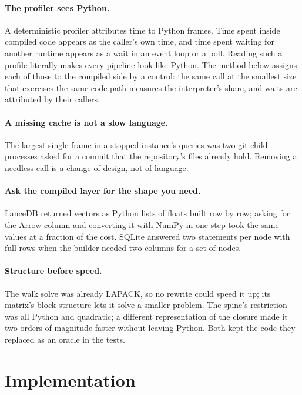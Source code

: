 \documentclass[11pt]{article}
\theoremstyle{plain}
\theoremstyle{definition}
\theoremstyle{remark}
\begin{document}
\paragraph{The profiler sees Python.} A deterministic profiler attributes time to Python frames.
Time spent inside compiled code appears as the caller's own time, and time spent waiting for another
runtime appears as a wait in an event loop or a poll. Reading such a profile literally makes every
pipeline look like Python. The method below assigns each of those to the compiled side by a control:
the same call at the smallest size that exercises the same code path measures the interpreter's
share, and waits are attributed by their callers.

\paragraph{A missing cache is not a slow language.} The largest single frame in a stopped
instance's queries was two git child processes asked for a commit that the repository's files
already hold. Removing a needless call is a change of design, not of language.

\paragraph{Ask the compiled layer for the shape you need.} LanceDB returned vectors as Python lists
of floats built row by row; asking for the Arrow column and converting it with NumPy in one step
took the same values at a fraction of the cost. SQLite answered two statements per node with full
rows when the builder needed two columns for a set of nodes.

\paragraph{Structure before speed.} The walk solve was already LAPACK, so no rewrite could speed it
up; its matrix's block structure lets it solve a smaller problem. The spine's restriction was all
Python and quadratic; a different representation of the closure made it two orders of magnitude
faster without leaving Python. Both kept the code they replaced as an oracle in the tests.

\section{Implementation}\label{sec:impl}
\end{document}
